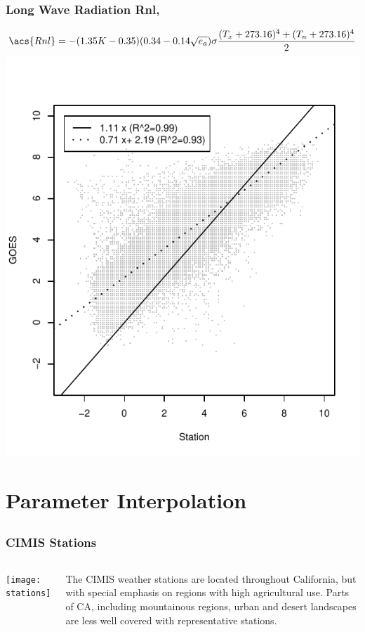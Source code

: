 \documentclass{beamer}
\begin{document}
\begin{frame}
  \frametitle{Long Wave Radiation \acs{Rnl},}
  \begin{equation*}
    \acs{Rnl} = -(1.35K-0.35)(0.34-0.14\sqrt{e_a})\sigma\frac{(T_x+273.16)^4+(T_n+273.16)^4}{2}
  \end{equation*}
  \vspace*{-1cm}
  \includegraphics{Rnl_R.pdf}
\end{frame}


\section[Interpolation]{Parameter Interpolation}
\subsection{}

\begin{frame}
  \frametitle{CIMIS Stations}
   \begin{columns}
     \texttt{[image: stations]}
     \begin{block}{}
       The \ac{CIMIS} weather stations are located throughout California, but
       with special emphasis on regions with high agricultural use.
       Parts of CA, including mountainous regions, urban and desert
       landscapes are less well covered with representative stations.
     \end{block}
   \end{columns}
\end{frame}
\end{document}
